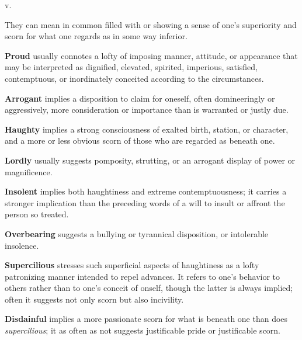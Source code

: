 \begin{description}[style=unboxed]
 v.
\begin{mynewitemize}
\item They can mean in common filled with or showing a sense of one's
superiority and scorn for what one regards as in some way inferior.
\item \textbf{Proud} usually connotes a lofty of imposing manner, attitude, or
appearance that may be interpreted as dignified, elevated, spirited, imperious,
satisfied, contemptuous, or inordinately conceited according to the
circumstances.
\item \textbf{Arrogant} implies a disposition to claim for oneself, often
domineeringly or aggressively, more consideration or importance than is
warranted or justly due.
\item \textbf{Haughty} implies a strong consciousness of exalted birth, station,
or character, and a more or less obvious scorn of those who are regarded as
beneath one.
\item \textbf{Lordly} usually suggests pomposity, strutting, or an arrogant
display of power or magnificence.
\item \textbf{Insolent} implies both haughtiness and extreme contemptuousness;
it carries a stronger implication than the preceding words of a will to insult
or affront the person so treated.
\item \textbf{Overbearing} suggests a bullying or tyrannical disposition, or
intolerable insolence.
\item \textbf{Supercilious} stresses such superficial aspects of haughtiness as
a lofty patronizing manner intended to repel advances. It refers to one's
behavior to others rather than to one's conceit of onself, though the latter is
always implied; often it suggests not only scorn but also incivility.
\item \textbf{Disdainful} implies a more passionate scorn for what is beneath
one than does \textit{supercilious}; it as often as not suggests justificable
pride or justificable scorn.
\end{mynewitemize}


\end{description}
